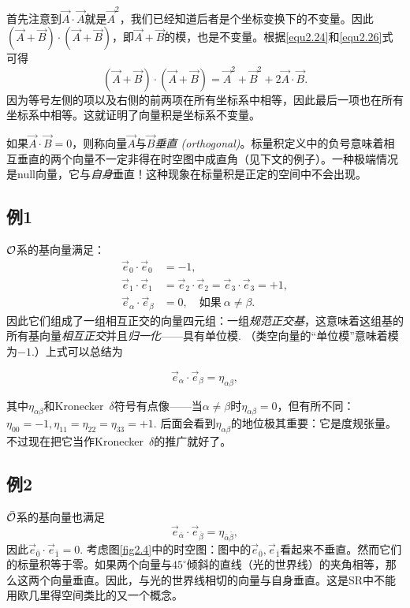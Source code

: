 首先注意到$\vec{A} \cdot \vec{A}$就是$\vec{A}^2$，我们已经知道后者是个坐标变换下的不变量。因此$(\vec{A} + \vec{B}) \cdot ( \vec{A} + \vec{B} )$，即$\vec{A} + \vec{B}$的模，也是不变量。根据\eqref{equ2.24}和\eqref{equ2.26}式可得
\begin{equation*}
    (\vec{A} + \vec{B}) \cdot ( \vec{A} + \vec{B} ) = \vec{A}^2 + \vec{B}^2 + 2 \vec{A} \cdot \vec{B}.
\end{equation*}
因为等号左侧的项以及右侧的前两项在所有坐标系中相等，因此最后一项也在所有坐标系中相等。这就证明了向量积是坐标系不变量。

如果$\vec{A} \cdot \vec{B} = 0$，则称向量$\vec{A}$与$\vec{B}$\textit{垂直 (orthogonal)}。标量积定义中的负号意味着相互垂直的两个向量不一定非得在时空图中成直角（见下文的例子）。一种极端情况是null向量，它与\textit{自身}垂直！这种现象在标量积是正定的空间中不会出现。

\subsection*{例1}
$\mathcal{O}$系的基向量满足：
\begin{align*}
    \vec{e}_0 \cdot \vec{e}_0 &= -1, \\
    \vec{e}_1 \cdot \vec{e}_1 &= \vec{e}_2 \cdot \vec{e}_2 = \vec{e}_3 \cdot \vec{e}_3 = +1, \\
    \vec{e}_\alpha \cdot \vec{e}_\beta &= 0, \quad \text{如果} \ \alpha \neq \beta.
\end{align*}
因此它们组成了一组相互正交的向量四元组：一组\textit{规范正交基}，这意味着这组基的所有基向量\textit{相互正交}并且\textit{归一化}——具有单位模. （类空向量的“单位模”意味着模为$-1$.）上式可以总结为
\begin{shaded}
\begin{equation}
    \vec{e}_\alpha \cdot \vec{e}_\beta = \eta_{\alpha \beta},
\label{equ2.27}
\end{equation}
\end{shaded}
其中$\eta_{\alpha \beta}$和Kronecker\ $\delta$符号有点像——当$\alpha \neq \beta$时$\eta_{\alpha \beta} = 0$，但有所不同：$\eta_{00} = -1, \eta_{11} = \eta_{22} = \eta_{33} = +1$. 后面会看到$\eta_{\alpha \beta}$的地位极其重要：它是度规张量。不过现在把它当作Kronecker\ $\delta$的推广就好了。

\subsection*{例2}
$\bar{\mathcal{O}}$系的基向量也满足
\begin{equation*}
    \vec{e}_{\bar{\alpha}} \cdot \vec{e}_{\bar{\beta}} = \eta_{\bar{\alpha} \bar{\beta}},
\end{equation*}
因此$\vec{e}_{\bar{0}} \cdot \vec{e}_{\bar{1}} = 0$. 考虑图\ref{fig2.4}中的时空图：图中的$\vec{e}_{\bar{0}}, \vec{e}_{\bar{1}}$看起来不垂直。然而它们的标量积等于零。如果两个向量与$45^\circ$倾斜的直线（光的世界线）的夹角相等，那么这两个向量垂直。因此，与光的世界线相切的向量与自身垂直。这是SR中不能用欧几里得空间类比的又一个概念。

